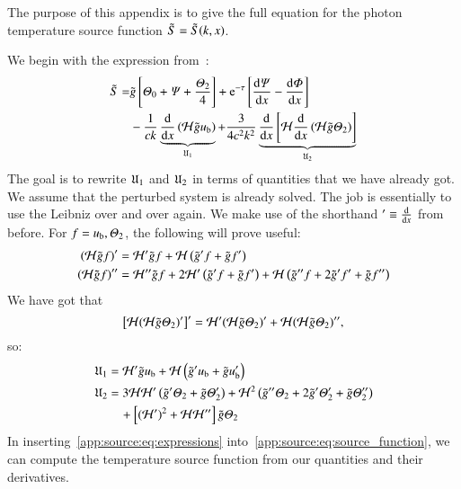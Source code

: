 

The purpose of this appendix is to give the full equation for the photon temperature source function $\tilde{S}=\tilde{S}(k, x)$.

We begin with the expression from~\citet[Eq.~(40)]{Callin2006}:
\begin{equation}\label{app:source:eq:source_function}
\begin{split}
    \tilde{S} =& \gti \left[\Theta_0 + \Psi + \frac{\Theta_2}{4}\right] + \eu[-\tau]\left[ \dv{\Psi}{x} -\dv{\Phi}{x} \right] \\
    &- \frac{1}{ck} \underbrace{\dv{}{x}\left(\Hp \gti u\ped{b} \right)}_{\expr_1}+ \frac{3}{4c^2k^2} \underbrace{\dv{}{x}\left[ \Hp \dv{}{x}\left(\Hp \gti\Theta_2 \right)  \right]}_{\expr_2}
\end{split}
\end{equation}
The goal is to rewrite $\mathfrak{U}_1$ and $\mathfrak{U}_2$ in terms of quantities that we have already got. We assume that the perturbed system is already solved. The job is essentially to use the Leibniz over and over again. We make use of the shorthand $'\equiv \dv{}{x}$ from before. For $f=u_\mathrm{b}, \varTheta_2 $, the following will prove useful:
\begin{subequations}
\begin{align}
    \left(\mathcal{H} \tilde{g} f \right)' &= \mathcal{H}'\tilde{g} f + \mathcal{H} \left( \tilde{g}' f + \tilde{g} f'\right)\\
    \left(\mathcal{H} \tilde{g} f \right)''&= \mathcal{H}'' \tilde{g} f + 2\mathcal{H}' \left(\tilde{g}' f + \tilde{g} f'\right) + \mathcal{H} \left(\tilde{g}'' f + 2\tilde{g}' f' + \tilde{g} f'' \right)
\end{align}
\end{subequations}
We have got that 
\begin{equation}
    \left[\mathcal{H} (\mathcal{H} \tilde{g} \varTheta_2)' \right]' = \mathcal{H}' (\mathcal{H} \tilde{g} \varTheta_2)' + \mathcal{H} (\mathcal{H} \tilde{g} \varTheta_2)'',
\end{equation}
so:
\begin{subequations}\label{app:source:eq:expressions}
\begin{align}
    \mathfrak{U}_1 &= \mathcal{H}'\tilde{g} u_\mathrm{b} + \mathcal{H} \left( \tilde{g}' u_\mathrm{b} + \tilde{g} u_\mathrm{b}'\right) \\
    \mathfrak{U}_2 &= 3\mathcal{H} \mathcal{H}' \left(\tilde{g}' \varTheta_2 + \tilde{g} \varTheta_2'\right) + \mathcal{H}^2\left(\tilde{g}'' \varTheta_2 +2 \tilde{g}' \varTheta_2' + \tilde{g} \varTheta_2''\right) \nonumber \\
    & \quad + \left[(\mathcal{H}')^2 + \mathcal{H} \mathcal{H}''\right]\tilde{g} \varTheta_2
\end{align}
\end{subequations}
In inserting~\cref{app:source:eq:expressions} into~\cref{app:source:eq:source_function}, we can compute the temperature source function from our quantities and their derivatives.
